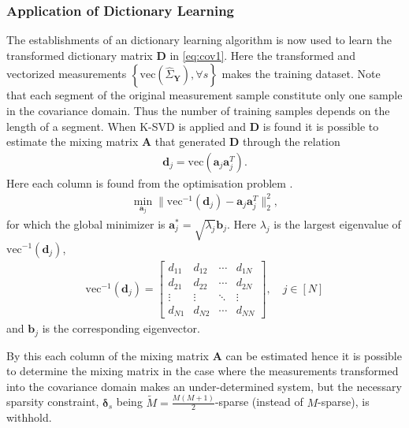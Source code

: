 \subsubsection{Application of Dictionary Learning}
The establishments of an dictionary learning algorithm is now used to learn the transformed dictionary matrix $\textbf{D}$ in \eqref{eq:cov1}. 
Here the transformed and vectorized measurements $\left\{ \text{vec}\left( \hat{\Sigma}_\textbf{Y}\right), \forall s\right\}$ makes the training dataset. 
Note that each segment of the original measurement sample constitute only one sample in the covariance domain. 
Thus the number of training samples depends on the length of a segment.     
When K-SVD is applied and $\mathbf{D}$ is found it is possible to estimate the mixing matrix $\mathbf{A}$ that generated $\textbf{D}$ through the relation 
\begin{align*}
\mathbf{d}_j = \text{vec}(\mathbf{a}_j \mathbf{a}_j^T).
\end{align*}
Here each column is found from the optimisation problem .
\begin{align*}
\min_{\textbf{a}_j} \| \text{vec}^{-1}(\textbf{d}_j) -\textbf{a}_j\textbf{a}_j^T\|_2^2, 
\end{align*}
for which the global minimizer is $\mathbf{a}^{\ast}_j=\sqrt{\lambda_j} \textbf{b}_j$. 
Here $\lambda_j$ is the largest eigenvalue of $\text{vec}^{-1}(\textbf{d}_j)$,
\begin{align*}
\text{vec}^{-1}(\textbf{d}_j) = 
\begin{bmatrix}
d_{11} & d_{12} & \cdots & d_{1N} \\
d_{21} & d_{22} & \cdots & d_{2N} \\
\vdots & \vdots & \ddots & \vdots \\
d_{N1} & d_{N2} & \cdots & d_{NN}
\end{bmatrix}, \quad j \in [N]
\end{align*}
and $\textbf{b}_j$ is the corresponding eigenvector.

By this each column of the mixing matrix $\textbf{A}$ can be estimated hence it is possible to determine the mixing matrix in the case where the measurements transformed into the covariance domain makes an under-determined system, but the necessary sparsity constraint, $\boldsymbol{\delta}_s$ being $\widetilde{M} = \frac{M(M+1)}{2}$-sparse (instead of $M$-sparse), is withhold.    




